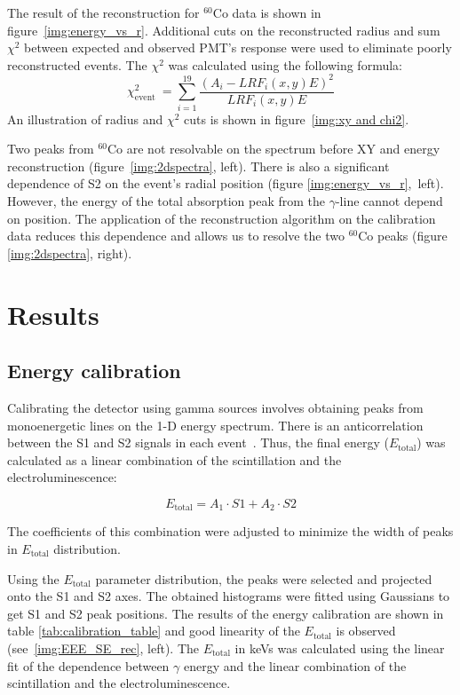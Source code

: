 \documentclass[a4paper,11pt]{article}
\begin{document}
The result of the reconstruction for $^{60}$Co data is shown in figure~\ref{img:energy_vs_r}. Additional cuts on the reconstructed radius and sum $\chi^2$ between expected and observed PMT's response were used to eliminate poorly reconstructed events. The $\chi^2$ was calculated using the following formula:
\begin{equation}
\chi^2_{\text {event }}=\sum\limits_{i=1}^{19} \frac{(A_i - LRF_i(x,y) E)^2}{LRF_i(x,y) E}
\end{equation}
An illustration of radius and $\chi^2$ cuts is shown in figure~\ref{img:xy and chi2}. 

Two peaks from $^{60}$Co are not resolvable on the spectrum before XY and energy reconstruction (figure~\ref{img:2dspectra}, left).  
There is also a significant dependence of S2 on the event's radial position (figure \ref{img:energy_vs_r},~left). However, the energy of the total absorption peak from the $\gamma$-line cannot depend on position. The application of the reconstruction algorithm on the calibration data reduces this dependence and allows us to resolve the two $^{60}$Co peaks (figure \ref{img:2dspectra}, right). 

\section{Results}
\label{sec:calibr_res}
\subsection{Energy calibration}
\label{sec:ene_calib}
Calibrating the detector using gamma sources involves obtaining peaks from monoenergetic lines on the 1-D energy spectrum.
There is an anticorrelation between the S1 and S2 signals in each event~\cite{PhysRevB.76.014115}. 
Thus, the final energy ($E_{\text{total}}$) was calculated as a linear combination of the scintillation and the electroluminescence:

\begin{equation}
\label{etotal}
    E_{\text{total}} = A_1\cdot S1+A_2\cdot S2
\end{equation}

The coefficients of this combination were adjusted to minimize the width of peaks in $E_{\text{total}}$ distribution.

Using the $E_{\text{total}}$ parameter distribution, the peaks were selected and projected onto the S1 and S2 axes. 
The obtained histograms were fitted using Gaussians to get S1 and S2 peak positions. 
The results of the energy calibration are shown in table \ref{tab:calibration_table} and good linearity of the $E_{\text{total}}$ is observed (see~\ref{img:EEE_SE_rec}, left). 
The $E_{\text{total}}$ in keVs was calculated using the linear fit of the dependence between $\gamma$ energy and the linear combination of the scintillation and the electroluminescence.
\end{document}
